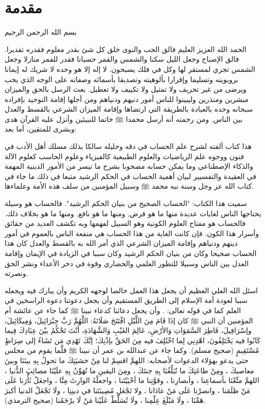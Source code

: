 \chapter{مقدمة}

\begin{center}
    بسم الله الرحمن الرحيم
\end{center}

الحمد الله العزيز العليم فالق الحب والنوى خلق كل شئ بقدر معلوم فقدره تقديرا. فالق الإصباح وجعل الليل سكنا والشمس والقمر حسبانا فقدر للقمر منازلا وجعل الشمس تجري لمستقر لها وكل في فلك يسبحون. لا إله إلا هو وحده لا شريك له  إيمانا بروبويته وتسليما وإقرارا بألوهيته وتصديقا بأسمائه وصفاته على الوجه الذي يحب ويرضى من غير تحريف ولا تمثيل ولا تكييف ولا تعطيل. بعث الرسل بالحق والميزان مبشرين ومنذرين وليبينوا للناس أمور دنيهم ودنياهم ومن أجلها إقامة التوحيد بإفراده سبحانه وحده بالعبادة بالطريقة التي ارتضاها وإقامة الميزان الشرعي بالقسط والعدل بين الناس. ومن رحمته أنه أرسل محمدا ﷺ خاتما للنبيئين وأنزل عليه القرآن هدى وبشرى للمتقين، أما بعد:

هذا كتاب ألفته لشرح علم الحساب في دقه وجليله سالكا بذلك مسلك أهل الأدب في فنون ووجوه علم الرياضيات والعلوم الطبيعية كالفيزياء وعلوم الحاسب كعلوم الآلة والذكاء الإصطناعي وما يمكن حسابه مصحوبا بشرح ما تيسر من الأمور الدينية المهمة في العقيدة والتفسيير لبيان أهمية الحساب في الحكم الرشيد متبعا في ذلك ما جاء في كتاب الله عز وجل وسنة نبه محمد ﷺ وسبيل المؤمنين من سلف هذه الأمة وعلماءها.

سميت هذا الكتاب: "الحساب الصحيح من بنيان الحكم الرشيد". فالحساب هو وسيلة يحتاجها الناس لغايات عديدة منها ما هو فرض, ومنها ما هو نافع, ومنها ما هو بخلاف ذلك. فالحساب هو مفتاح العلوم الكونية وهو السبيل لفهمها وبه تكشف العديد من حقائق وأسرار هذا الكون. فإن كانت الغاية من هذا الحساب هي منفعة الناس بالعموم في أمور دينهم ودنياهم وإقامة الميزان الشرعي الذي أمر الله به بالقسط والعدل كان هذا الحساب صحيحا وكان من بنيان الحكم الرشيد وكان سببا في الزيادة في الإيمان وإقامة العدل بين الناس وسبيلا للتطور العلمي والحضاري وقوة في دحر الأعداء ونشر الحق ونصرته.

اسئل الله العلي العظيم أن يجعل هذا العمل خالصا لوجهه الكريم وأن يبارك فيه ويجعله سببا لعودة أمة الإسلام إلى الطريق المستقيم وأن يجعل دعوتنا دعوة الراسخين في العلم كما في قوله تعالى:
\quranayah*[3][7][32]\quranayah*[3][8]{\footnotesize \surahname*[3]}. وأن يجعل دعائنا كدعاء نبينا ﷺ كما جاء عن عائشة أم المؤمنين أن النبي ﷺ كان إذَا قَامَ مِنَ اللَّيْلِ افْتَتَحَ صَلَاتَهُ: اللَّهُمَّ رَبَّ جِبْرَائِيلَ، وَمِيكَائِيلَ، وإسْرَافِيلَ، فَاطِرَ السَّمَوَاتِ وَالأرْضِ، عَالِمَ الغَيْبِ وَالشَّهَادَةِ، أَنْتَ تَحْكُمُ بيْنَ عِبَادِكَ فِيما كَانُوا فيه يَخْتَلِفُونَ، اهْدِنِي لِما اخْتُلِفَ فيه مِنَ الحَقِّ بإذْنِكَ؛ إنَّكَ تَهْدِي مَن تَشَاءُ إلى صِرَاطٍ مُسْتَقِيمٍ {\footnotesize (صحيح مسلم)}.  وكما جاء عن عبدالله بن عمر أن نبينا ﷺ قلَّما يقوم من مجلس حتى يدعو بهؤلاء الدعوات لأصحابه: اللهمَّ اقسِمْ لنا مِنْ خشيَتِكَ ما تحولُ بِهِ بينَنَا وبينَ معاصيكَ ، ومِنْ طاعَتِكَ ما تُبَلِّغُنَا بِهِ جنتَكَ ، ومِنَ اليقينِ ما تُهَوِّنُ بِهِ علَيْنَا مصائِبَ الدُّنيا ، اللهمَّ متِّعْنَا بأسماعِنا ، وأبصارِنا ، وقوَّتِنا ما أحْيَيْتَنا ، واجعلْهُ الوارِثَ مِنَّا ، واجعَلْ ثَأْرَنا عَلَى مَنْ ظلَمَنا ، وانصرْنا عَلَى مَنْ عادَانا ، ولا تَجْعَلِ مُصِيبَتَنا في دينِنِا ، ولَا تَجْعَلْ الدنيا أكبرَ هَمِّنَا ، ولَا مَبْلَغَ عِلْمِنا ، ولَا تُسَلِّطْ عَلَيْنا مَنْ لَا يرْحَمُنا (صحيح الترمذي).